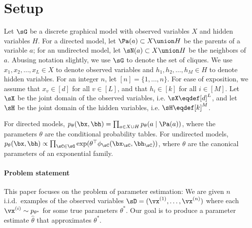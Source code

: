 \section{Setup}
\label{sec:setup}

Let $\sG$ be a discrete graphical model with observed variables $X$ and
  hidden variables $H$.
For a directed model,
  let $\Pa(a) \subset X \union H$ be the parents of a variable $a$;
  for an undirected model,
  let $\sN(a) \subset X \union H$ be the neighbors of $a$.
  Abusing notation slightly, we use $\sG$ to denote the set of cliques.
We use $x_1, x_2, \dots, x_L \in X$ to denote observed variables and
  $h_1, h_2, \dots, h_M \in H$ to denote hidden variables.
For an integer $n$, let $[n] = \{ 1, \dots, n \}$.
For ease of exposition, we assume that $x_v \in [d]$ for
all $v \in [L]$, and that $h_i \in [k]$ for all $i \in [M]$.
Let $\sX$ be the joint domain of the observed variables, i.e. $\sX \eqdef [d]^L$, and
let $\sH$ be the joint domain of the hidden variables, i.e. $\sH \eqdef [k]^M$.

For directed models,
$p_\theta(\bx,\bh) = \prod_{a \in X \cup H} p_\theta(a \mid \Pa(a))$,
where the parameters $\theta$ are the conditional probability tables.
For undirected models,
$p_\theta(\bx,\bh) \propto \prod_{\sC \in \sG} \exp(\theta^\top\phi_\sC(\bx_\sC, \bh_\sC))$,
where $\theta$ are the canonical parameters of an exponential family.


\paragraph{Problem statement}

This paper focuses on the problem of parameter estimation:
We are given $n$ i.i.d.~examples of the observed variables $\sD
  = (\vx^{(1)}, \dots, \vx^{(n)})$ where each $\vx^{(i)} \sim p_{\theta^*}$ for
  some true parameters $\theta^*$.
Our goal is to produce a parameter estimate $\hat\theta$ that
  approximates $\theta^*$.

